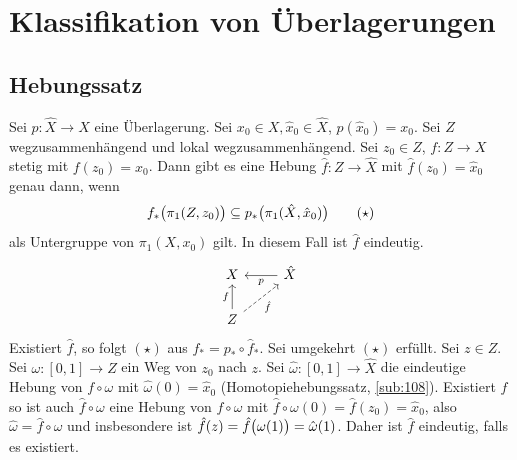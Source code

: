 \section{Klassifikation von Überlagerungen} %
\label{sec:13}

\subsection{Hebungssatz} %
\label{sub:131}
Sei $p: \hat{X} \to X$ eine Überlagerung. Sei $x_0 \in X, \hat{x}_0 \in \hat{X}$, $p(\hat{x}_0)= x_0$. Sei $Z$ wegzusammenhängend und lokal wegzusammenhängend. Sei 
$z_0 \in Z$, $f : Z \to X$ stetig mit $f(z_0)= x_0$. Dann gibt es eine Hebung $\hat{f} : Z \to \hat{X}$ mit $\hat{f} (z_0) = \hat{x}_0$ genau dann, wenn 
\[
	f_*\enbrace[\big]{\pi_1 (Z, z_0)} \subseteq  p_* \enbrace[\big]{\pi_1(\hat{X}, \hat{x}_0)} \tag*{$(\star)$}
\]
als Untergruppe von $\pi_1(X,x_0)$ gilt. In diesem Fall ist $\hat{f}$ eindeutig.
\[
	\begin{tikzcd}
		X & \hat{X} \lar{p} \\
		Z \uar{f}  \urar[dashed, swap]{\hat{f}}&
	\end{tikzcd}
\]
Existiert $\hat{f}$, so folgt $(\star)$ aus $f_* = p_* \circ\hat{f}_*$. Sei umgekehrt $(\star)$ erfüllt. Sei $z\in Z$. Sei $\omega : [0,1]\to Z$ ein Weg von $z_0$ nach $z$.
Sei $\hat{\omega} : [0,1] \to \hat{X}$ die eindeutige Hebung von $f \circ \omega$ mit $\hat{\omega}(0)= \hat{x}_0$ (Homotopiehebungssatz, \ref{sub:108}). Existiert 
$\hat{f}$ so ist auch $\hat{f} \circ \omega$ eine Hebung von $f \circ \omega$ mit $\hat{f} \circ \omega (0) = \hat{f}(z_0)= \hat{x}_0$, also 
$\hat{\omega} = \hat{f} \circ \omega$ und insbesondere ist $\hat{f}(z)= \hat{f} \enbrace[\big]{\omega(1)} = \hat{\omega}(1)$. Daher ist $\hat{f}$ eindeutig, falls es 
existiert.

